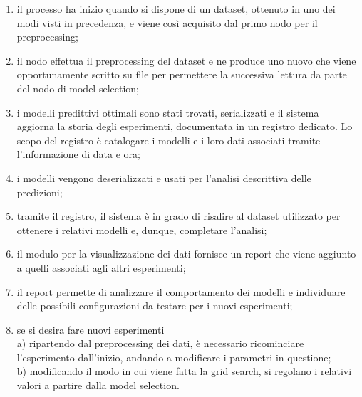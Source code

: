 \documentclass[12pt]{report}
\theoremstyle{definition}
\begin{document}
\begin{enumerate}
    \item il processo ha inizio quando si dispone di un dataset, ottenuto in uno dei modi visti in precedenza, e viene così acquisito dal primo nodo per il preprocessing;
    \item  il nodo effettua il preprocessing del dataset e ne produce uno nuovo che viene opportunamente scritto su file per permettere la successiva lettura da parte del nodo di model selection;
    \item i modelli predittivi ottimali sono stati trovati, serializzati e il sistema aggiorna la storia degli esperimenti, documentata in un registro dedicato. Lo scopo del registro è catalogare i modelli e i loro dati associati tramite l'informazione di data e ora;
    \item i modelli vengono deserializzati e usati per l'analisi descrittiva delle predizioni;
    \item tramite il registro, il sistema è in grado di risalire al dataset utilizzato per ottenere i relativi modelli e, dunque, completare l'analisi;
    \item il modulo per la visualizzazione dei dati fornisce un report che viene aggiunto a quelli associati agli altri esperimenti;
    \item il report permette di analizzare il comportamento dei modelli e individuare delle possibili configurazioni da testare per i nuovi esperimenti;
    \item se si desira fare nuovi esperimenti
    \\
    a) ripartendo dal preprocessing dei dati, è necessario ricominciare l'esperimento dall'inizio, andando a modificare i parametri in questione;
    \\
    b) modificando il modo in cui viene fatta la grid search, si regolano i relativi valori a partire dalla model selection.
\end{enumerate}
\end{document}
